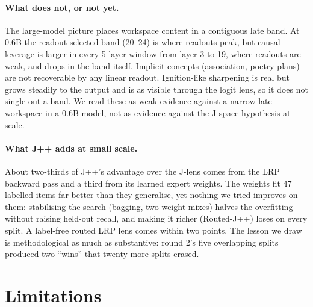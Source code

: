 \documentclass[11pt]{article}
\theoremstyle{definition}
\begin{document}
\paragraph{What does not, or not yet.} The large-model picture places workspace content in a
contiguous late band. At 0.6B the readout-selected band (20--24) is where readouts peak, but causal
leverage is larger in every 5-layer window from layer 3 to 19, where readouts are weak, and drops in
the band itself. Implicit concepts (association,
poetry plans) are not recoverable by any linear readout. Ignition-like sharpening is real but grows
steadily to the output and is as visible through the logit lens, so it does not single out a band. We read these as weak evidence against a narrow late
workspace in a 0.6B model, not as evidence against the J-space hypothesis at scale.

\paragraph{What J++ adds at small scale.} About two-thirds of J++'s advantage over the J-lens comes
from the LRP backward pass and a third from its learned expert weights. The weights fit 47 labelled
items far better than they generalise, yet nothing we tried improves on them: stabilising the search
(bagging, two-weight mixes) halves the overfitting without raising held-out recall, and making it richer
(Routed-J++) loses on every split. A label-free routed LRP lens comes within two points. The lesson we
draw is methodological as much as substantive: round 2's five overlapping splits produced two
``wins'' that twenty more splits erased.

\section{Limitations}
\label{sec:limitations}
\end{document}

